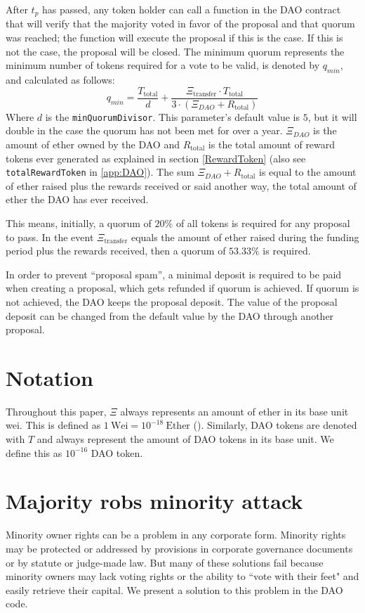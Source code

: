 \documentclass[9pt,oneside]{amsart}
\begin{document}
\begin{multicols}{2}
After $t_p$ has passed, any token holder can call a function in the DAO contract that will verify that the majority voted in favor of the proposal and that quorum was reached; the function will execute the proposal if this is the case. If this is not the case, the proposal will be closed. The minimum quorum represents the minimum number of tokens required for a vote to be valid, is denoted by $q_{min}$, and calculated as follows:
\begin{equation}
 q_{min} = \frac{T_{\text{total}}}{d} + \frac{\Xi_{\text{transfer}} \cdot T_{\text{total}}}{3 \cdot (\Xi_{DAO} + R_{\text{total}})}
 \label{minQuorum}
\end{equation}
Where $d$ is the \verb|minQuorumDivisor|. This parameter's default value is $5$, but it will double in the case the quorum has not been met for over a year.
$\Xi_{DAO}$ is the amount of ether owned by the DAO and $R_{\text{total}}$ is the total amount of reward tokens ever generated as explained in section \ref{RewardToken} (also see \verb|totalRewardToken| in \ref{app:DAO}). The sum $\Xi_{DAO} + R_{\text{total}}$ is equal to the amount of ether raised plus the rewards received or said another way, the total amount of ether the DAO has ever received.

This means, initially, a quorum of  $20\%$ of all tokens is required for any proposal to pass. In the event $\Xi_{\text{transfer}}$ equals the amount of ether raised during the funding period plus the rewards received, then a quorum of $53.33\%$ is required.

In order to prevent ``proposal spam'', a minimal deposit is required to be paid when creating a proposal, which gets refunded if quorum is achieved. If quorum is not achieved, the DAO keeps the proposal deposit. The value of the proposal deposit can be changed from the default value by the DAO through another proposal.

\section{Notation}
Throughout this paper, $\Xi$ always represents an amount of ether in its base unit wei. This is defined as $1 \: \text{Wei} = 10^{-18} \: \text{Ether}$ (\cite{Wood2014ethereum}).
Similarly, DAO tokens are denoted with $T$ and always represent the amount of DAO tokens in its base unit. We define this as $10^{-16}$ DAO token.
\section{Majority robs minority attack}
Minority owner rights can be a problem in any corporate form. Minority rights may be protected or addressed by provisions in corporate governance documents or by statute or judge-made law. But many of these solutions fail because minority owners may lack voting rights or the ability to ``vote with their feet" and easily retrieve their capital. We present a solution to this problem in the DAO code. 


\end{multicols}
\end{document}
